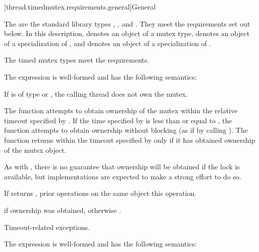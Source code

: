 [thread.timedmutex.requirements.general]{General}

\pnum
The  are the standard library types ,
, and . They
meet the requirements set out below.
In this description,  denotes an object of a mutex type,
 denotes an object of a
specialization of , and  denotes an
object of a
specialization of .
\begin{note}
The timed mutex types meet the 
requirements.
\end{note}

\pnum
The expression  is well-formed
and has the following semantics:

\begin{itemdescr}
\pnum
\expects
If  is of type  or
, the calling thread does not
own the mutex.

\pnum
\effects
The function attempts to obtain ownership of the mutex within the
relative timeout
specified by . If the time specified by  is less than or
equal to , the function attempts to obtain ownership without blocking (as if by calling
). The function returns within the timeout specified by
 only if it has obtained ownership of the mutex object.
\begin{note}
As
with , there is no guarantee that ownership will be obtained if the
lock is available, but implementations are expected to make a strong effort to do so.
\end{note}

\pnum
\sync
If  returns , prior  operations
on the same object  this operation.

\pnum
\result
{}

\pnum
\returns
{} if ownership was obtained, otherwise .

\pnum
\throws
Timeout-related exceptions.
\end{itemdescr}

\pnum
The expression  is well-formed
and has the following semantics:

